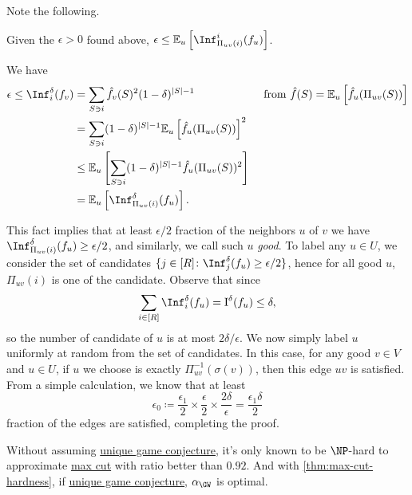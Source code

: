 Note the following.
\begin{remark}[Fact]
	Given the \(\epsilon > 0\) found above, \(\epsilon \leq \mathbb{E}_{u}\left[\Inf_{\Pi _{uv}(i)}^i (f_u) \right]\).
\end{remark}
\begin{explanation}
	We have
	\[
		\begin{aligned}
			\epsilon
			\leq \Inf_i^\delta (f_v)
			 & = \sum_{S \ni i} \hat{f} _v(S)^2(1-\delta )^{\vert S \vert - 1}                                            & \text{ from } \hat{f} (S) = \mathbb{E}_{u}\left[\hat{f} _u(\Pi _{uv}(S)) \right] \\
			 & = \sum_{S \ni i} (1-\delta )^{\vert S \vert - 1}\mathbb{E}_{u}\left[\hat{f} _u(\Pi _{uv}(S)) \right] ^2                                                                                       \\
			 & \leq \mathbb{E}_{u}\left[\sum_{S \ni i} (1-\delta )^{\vert S \vert - 1} \hat{f} _u(\Pi _{uv}(S))^2 \right]                                                                                    \\
			 & = \mathbb{E}_{u}\left[\Inf_{\Pi _{uv}(i)}^\delta (f_u) \right].
		\end{aligned}
	\]
\end{explanation}

This fact implies that at least \(\epsilon / 2\) fraction of the neighbors \(u\) of \(v\) we have \(\Inf_{\Pi _{uv}(i)}^\delta  (f_u) \geq \epsilon / 2\), and similarly, we call such \(u\) \emph{good}. To label any \(u\in U\), we consider the set of candidates \(\{ j\in [R]\colon \Inf_{j}^\delta (f_u) \geq \epsilon /2 \} \), hence for all good \(u\), \(\Pi _{uv}(i)\) is one of the candidate. Observe that since
\[
	\sum_{i\in [R]} \Inf_{i}^\delta (f_u) = \operatorname{I}^{\delta }(f_u) \leq \delta,
\]
so the number of candidate of \(u\) is at most \(2\delta / \epsilon \). We now simply label \(u\) uniformly at random from the set of candidates. In this case, for any good \(v\in V\) and \(u\in U\), if \(u\) we choose is exactly \(\Pi_{uv}^{-1} (\sigma (v)) \), then this edge \(uv\) is satisfied. From a simple calculation, we know that at least
\[
	\epsilon _0 \coloneqq \frac{\epsilon _1}{2}\times \frac{\epsilon }{2} \times \frac{2\delta }{\epsilon } = \frac{\epsilon _1 \delta }{2}
\]
fraction of the edges are satisfied, completing the proof.

\begin{remark}
	Without assuming \hyperref[conj:unique-game]{unique game conjecture}, it's only known to be \(\NP\)-hard to approximate \hyperref[prb:max-cut]{max cut} with ratio better than \(0.92\). And with \autoref{thm:max-cut-hardness}, if \hyperref[conj:unique-game]{unique game conjecture}, \(\alpha _{\GW }\) is optimal.
\end{remark}